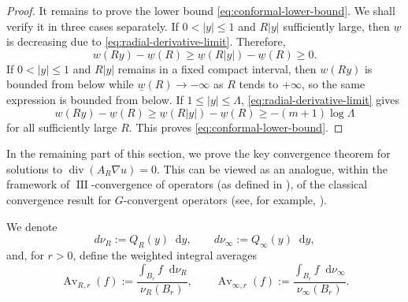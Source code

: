 \documentclass[10pt,a4paper]{amsart}
\numberwithin{equation}{section}
\newcommand{\dd}{\mathop{}\!\mathrm{d}}%
\begin{document}
\begin{proof}
It remains to prove the lower bound \cref{eq:conformal-lower-bound}. We shall verify it in three cases separately.
If $0<|y|\leq 1$ and $R|y|$ sufficiently large, then $\underline{w}$ is decreasing due to \cref{eq:radial-derivative-limit}. Therefore, 
\[
   w(Ry)-\underline{w}(R)
   \geq \underline w(R|y|)-\underline w(R)
   \geq0.
\]
If $0<|y|\leq 1$ and $R|y|$ remains in a fixed compact interval, then $w(Ry)$ is bounded
from below while $\underline w(R)\to-\infty$ as $R$ tends to $+\infty$, so the same expression is bounded from below.
If $1\leq |y|\leq\Lambda$,
\cref{eq:radial-derivative-limit} gives
\[
    w(Ry)-\underline{w}(R)\geq
    \underline w(R|y|)-\underline w(R)
    \geq-(m+1)\log\Lambda
\]
for all sufficiently large $R$.  This proves
\cref{eq:conformal-lower-bound}.
\end{proof}

{In the remaining part of this section, we prove the key convergence theorem for solutions to  $\operatorname{div}(A_R\nabla u)=0$.
This can be viewed as an analogue, within the framework of $\operatorname{III}$-convergence of operators (as defined in \cite[Page 76]{ZKON}), of the classical convergence result for $G$-convergent operators (see, for example, \cite[(iv) in page 220]{L}).}

We denote
\[
    d\nu_R:=Q_R(y)\dd y,
    \qquad
    d\nu_\infty:=Q_\infty(y)\dd y,
\]
and, for $r>0$, define the weighted integral averages
\[
    \operatorname{Av}_{R,r}(f)
    :=\frac{\displaystyle\int_{B_r}f\dd\nu_R}
            {\displaystyle\nu_R(B_r)},
    \qquad
    \operatorname{Av}_{\infty,r}(f)
    :=\frac{\displaystyle\int_{B_r}f\dd\nu_\infty}
            {\displaystyle\nu_\infty(B_r)}.
\]
\end{document}
